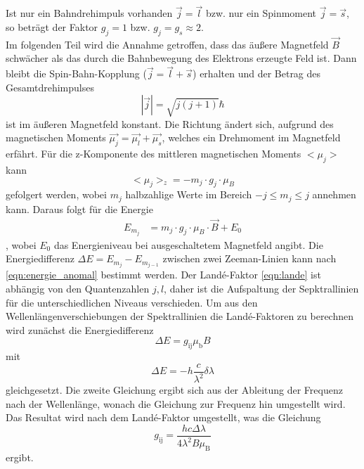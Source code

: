 Ist nur ein Bahndrehimpuls vorhanden $\vec{j}=\vec{l}$ bzw. nur ein Spinmoment $\vec{j}=\vec{s}$, so beträgt der Faktor $g_j=1$ bzw. $g_j = g_s \approx 2$.
\\
Im folgenden Teil wird die Annahme getroffen, dass das äußere Magnetfeld $\vec{B}$ schwächer als das durch die Bahnbewegung des Elektrons erzeugte Feld ist.
Dann bleibt die Spin-Bahn-Kopplung ($\vec{j}=\vec{l}+\vec{s}$) erhalten und der Betrag des Gesamtdrehimpulses
\begin{equation*}
    |\vec{j}| = \sqrt{j(j+1)} \hbar
\end{equation*}
ist im äußeren Magnetfeld konstant.
Die Richtung ändert sich, aufgrund des magnetischen Moments $\vec{\mu_j} = \vec{\mu_l} + \vec{\mu_s}$, welches ein Drehmoment im Magnetfeld erfährt.
Für die z-Komponente des mittleren magnetischen Moments $<\mu_j>$ kann
\begin{equation*}
    <\mu_j>_z = - m_j \cdot g_j \cdot \mu_B
\end{equation*}
gefolgert werden, wobei $m_j$ halbzahlige Werte im Bereich $-j \leq m_j \leq j$ annehmen kann.
Daraus folgt für die Energie
\begin{align}
    E_{m_j} &= m_j \cdot g_j \cdot \mu_B \cdot \vec{B} + E_0
    \label{eqn:energie_anomal}
\end{align}
, wobei $E_0$ das Energieniveau bei ausgeschaltetem Magnetfeld angibt.
Die Energiedifferenz $\Delta E = E_{m_j} - E_{m_{j-1}}$ zwischen zwei Zeeman-Linien kann nach \autoref{eqn:energie_anomal} bestimmt werden.
Der Landé-Faktor \eqref{eqn:lande} ist abhängig von den Quantenzahlen $j,l$, daher ist die Aufspaltung der Sepktrallinien für die unterschiedlichen Niveaus verschieden.
Um aus den Wellenlängenverschiebungen der Spektrallinien die Landé-Faktoren zu berechnen wird zunächst die Energiedifferenz
\begin{equation*}
    \Delta E = g _\text{ij} \mu _\text{b} B
\end{equation*}
mit
\begin{equation*}
    \Delta E = -h \frac{c}{\lambda^2} \delta \lambda
\end{equation*}
gleichgesetzt.
Die zweite Gleichung ergibt sich aus der Ableitung der Frequenz nach der Wellenlänge, wonach die Gleichung zur Frequenz hin umgestellt wird.
Das Resultat wird nach dem Landé-Faktor umgestellt, was die Gleichung 
\begin{equation}
    g_\text{ij} = \frac{hc \Delta \lambda}{4 \lambda^2 B \mu_\text{B}}
    \label{eq:Lande_Faktor}
\end{equation}
ergibt.
\FloatBarrier

